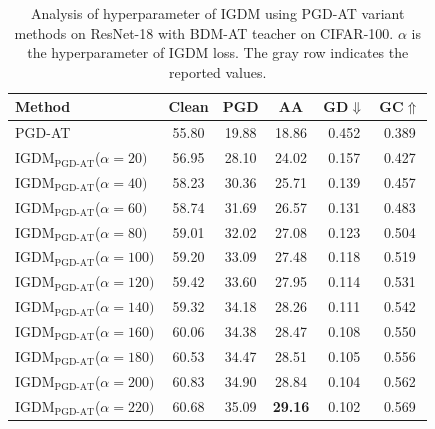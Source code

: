 \documentclass{article} %
\begin{document}
\begin{table}[h]
 \centering
 \caption{Analysis of hyperparameter of IGDM using PGD-AT variant methods on ResNet-18 with BDM-AT teacher on CIFAR-100. $\alpha$ is the hyperparameter of IGDM loss. The gray row indicates the reported values.}
 \setlength{\tabcolsep}{14pt}
 \begin{tabular}{lccccc}
 \toprule

 Method& Clean & PGD & AA & GD$\Downarrow$ & GC$\Uparrow$ \\
\midrule
 PGD-AT \citep{PGD}& 55.80 & 19.88 & 18.86 & 0.452 & 0.389 \\
 IGDM$_\text{PGD-AT}$($\alpha=20)$  & 56.95 & 28.10 & 24.02 & 0.157 & 0.427\\
 IGDM$_\text{PGD-AT}$($\alpha=40)$ & 58.23 & 30.36 & 25.71 & 0.139 & 0.457\\
 IGDM$_\text{PGD-AT}$($\alpha=60)$& 58.74 & 31.69 & 26.57 & 0.131 & 0.483\\
 IGDM$_\text{PGD-AT}$($\alpha=80)$& 59.01 & 32.02 & 27.08 & 0.123 & 0.504\\
 IGDM$_\text{PGD-AT}$($\alpha=100)$& 59.20 & 33.09 & 27.48 & 0.118 & 0.519\\
 IGDM$_\text{PGD-AT}$($\alpha=120)$& 59.42 & 33.60 & 27.95 & 0.114 & 0.531\\
 IGDM$_\text{PGD-AT}$($\alpha=140)$& 59.32 & 34.18 & 28.26 & 0.111 & 0.542\\
 IGDM$_\text{PGD-AT}$($\alpha=160)$& 60.06 & 34.38 & 28.47 & 0.108 & 0.550\\
 IGDM$_\text{PGD-AT}$($\alpha=180)$& 60.53 & 34.47 & 28.51 & 0.105 & 0.556\\
 IGDM$_\text{PGD-AT}$($\alpha=200)$& 60.83 & 34.90 & 28.84 & 0.104 & 0.562\\
  \rowcolor{gray!30} 
 IGDM$_\text{PGD-AT}$($\alpha=220)$& 60.68 & 35.09 & \textbf{29.16} & 0.102 & 0.569\\

\end{tabular}
\end{table}
\end{document}
